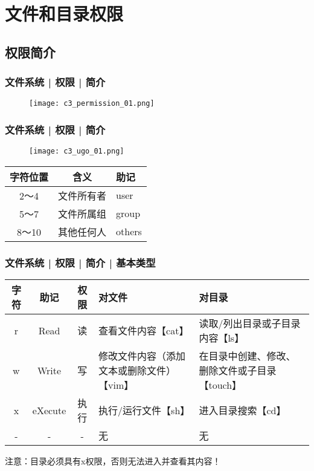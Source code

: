 \section{文件和目录权限}
\subsection{权限简介}
\begin{frame}
  \frametitle{文件系统 | 权限 | \alert{简介}}
  \begin{figure}
    \centering
    \texttt{[image: c3\_permission\_01.png]}
  \end{figure}
\end{frame}

\begin{frame}
  \frametitle{文件系统 | 权限 | \alert{简介}}
  \begin{figure}
    \centering
    \texttt{[image: c3\_ugo\_01.png]}
  \end{figure}
  \begin{table}
    \centering
    \begin{tabular}{ccl}
      \hline
      \rowcolor{blue!50}字符位置 & 含义 & 助记\\
      \hline
      2～4 & 文件所有者 & user\\
      5～7 & 文件所属组 & group\\
      8～10 & 其他任何人 & others\\
      \hline
    \end{tabular}
  \end{table}
\end{frame}

\begin{frame}
  \frametitle{文件系统 | 权限 | 简介 | \alert{基本类型}}
  \begin{table}
    \centering
    \begin{tabularx}{\textwidth}{cccXX}
      \hline
      \rowcolor{blue!50}字符 & 助记 & 权限 & 对文件 & 对目录\\
      \hline
      r & Read & 读 & 查看文件内容【cat】 & 读取/列出目录或子目录内容【ls】\\
      w & Write & 写 & 修改文件内容（添加文本或删除文件）【vim】 & 在目录中创建、修改、删除文件或子目录【touch】\\
      x & eXecute & 执行 & 执行/运行文件【sh】 & 进入目录搜索【cd】\\
      - & - & - & 无 & 无\\
      \hline
    \end{tabularx}
  \end{table}
  \centering
  注意：目录必须具有x权限，否则无法进入并查看其内容！
\end{frame}

